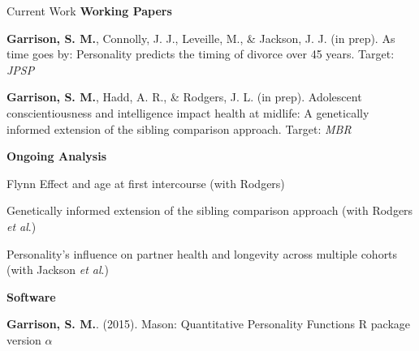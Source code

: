 \documentclass {resume}
\newcommand{\R}{\textup{\textrm{R}}\xspace}
\newcommand{\meb}{{\bf Garrison, S. M.}\xspace}
\newcommand{\et}{\textit{et al}.\xspace}
\newlength{\wideitemsep}
\let\olditem\item
\renewcommand{\item}{\setlength{\itemsep}{\wideitemsep}\olditem}
\begin{document}
\begin{rSection}{\textrm{Current Work}}
{\large {\bf Working Papers}}
\begin{etaremune}\item\meb, Connolly, J. J., Leveille, M., \& Jackson, J. J. (in prep). As time goes by: Personality predicts the timing of divorce over 45 years. Target: \textit{JPSP}
\item\meb, Hadd, A. R., \& Rodgers, J. L. (in prep). Adolescent conscientiousness and intelligence impact health at midlife: A genetically informed extension of the sibling comparison approach. Target: \textit{MBR}%
\end{etaremune}
{\large {\bf Ongoing Analysis}}\begin{etaremune}
\item Flynn Effect and age at first intercourse (with Rodgers)
\item Genetically informed extension of the sibling comparison approach (with Rodgers \et)
\item Personality's influence on partner health and longevity across multiple cohorts (with Jackson \et)
\end{etaremune}{\large {\bf Software}}\begin{etaremune}
\item \meb. (2015). Mason: Quantitative Personality Functions \R package version $\alpha$ 
\end{etaremune}\end{rSection}
\end{document}
